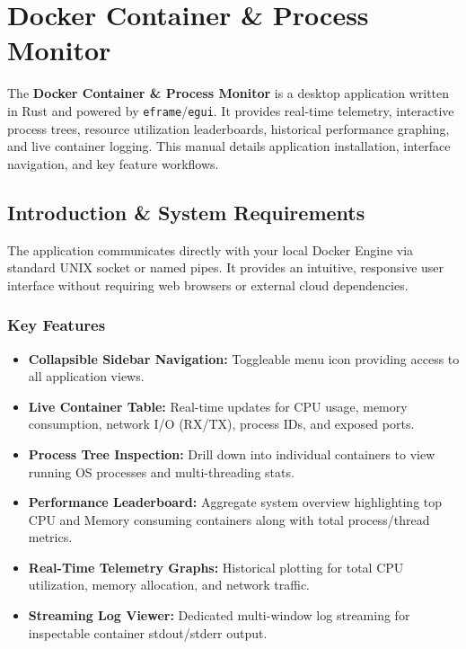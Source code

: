 \chapter{Docker Container \& Process Monitor}
\label{app:dockermonitor}

The \textbf{Docker Container \& Process Monitor} is a desktop application written in Rust and powered by \texttt{eframe}/\texttt{egui}. It provides real-time telemetry, interactive process trees, resource utilization leaderboards, historical performance graphing, and live container logging. This manual details application installation, interface navigation, and key feature workflows.

\section{Introduction \& System Requirements}

The application communicates directly with your local Docker Engine via standard UNIX socket or named pipes. It provides an intuitive, responsive user interface without requiring web browsers or external cloud dependencies.

\subsection{Key Features}
\begin{itemize}
    \item \textbf{Collapsible Sidebar Navigation:} Toggleable menu icon providing access to all application views.
    \item \textbf{Live Container Table:} Real-time updates for CPU usage, memory consumption, network I/O (RX/TX), process IDs, and exposed ports.
    \item \textbf{Process Tree Inspection:} Drill down into individual containers to view running OS processes and multi-threading stats.
    \item \textbf{Performance Leaderboard:} Aggregate system overview highlighting top CPU and Memory consuming containers along with total process/thread metrics.
    \item \textbf{Real-Time Telemetry Graphs:} Historical plotting for total CPU utilization, memory allocation, and network traffic.
    \item \textbf{Streaming Log Viewer:} Dedicated multi-window log streaming for inspectable container stdout/stderr output.
\end{itemize}


